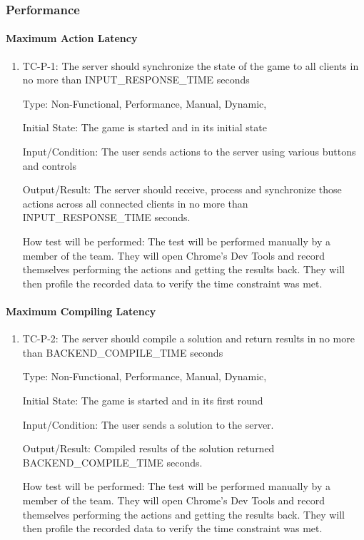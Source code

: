 \documentclass[12pt, titlepage]{article}
\begin{document}
\subsubsection{Performance}

\paragraph{Maximum Action Latency}

\begin{enumerate}
\item{TC-P-1: The server should synchronize the state of the game to all clients in no more than INPUT\_RESPONSE\_TIME seconds}

Type: Non-Functional, Performance, Manual, Dynamic,
					
Initial State: The game is started and in its initial state
					
Input/Condition: The user sends actions to the server using various buttons and controls
					
Output/Result: The server should receive, process and synchronize those actions across all connected clients in no more than INPUT\_RESPONSE\_TIME seconds.
					
How test will be performed: The test will be performed manually by a member of the team. They will open Chrome's Dev Tools and record themselves performing the actions and getting the results back. They will then profile the recorded data to verify the time constraint was met.
\end{enumerate}

\paragraph{Maximum Compiling Latency}

\begin{enumerate}
\item{TC-P-2: The server should compile a solution and return results in no more than BACKEND\_COMPILE\_TIME seconds}

Type: Non-Functional, Performance, Manual, Dynamic,
					
Initial State: The game is started and in its first round

Input/Condition: The user sends a solution to the server.
					
Output/Result: Compiled results of the solution returned BACKEND\_COMPILE\_TIME seconds.
					
How test will be performed: The test will be performed manually by a member of the team. They will open Chrome's Dev Tools and record themselves performing the actions and getting the results back. They will then profile the recorded data to verify the time constraint was met.
\end{enumerate}
\end{document}

